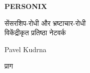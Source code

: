 \thispagestyle{empty}
\begin{center}
  {\sffamily\bfseries\fontsize{34}{40}\selectfont PERSONIX\par}
  \vspace{2.2em}
  {\rmfamily\large सेंसरशिप-रोधी और भ्रष्टाचार-रोधी\\[0.25em]
   विकेंद्रीकृत प्रतिष्ठा नेटवर्क\par}
\end{center}
\begin{center}
  {\rmfamily\Large Pavel Kudrna\par}
  \vspace{0.45em}
  {\rmfamily\small प्राग\quad\textbullet{}\par}
\end{center}
\clearpage
